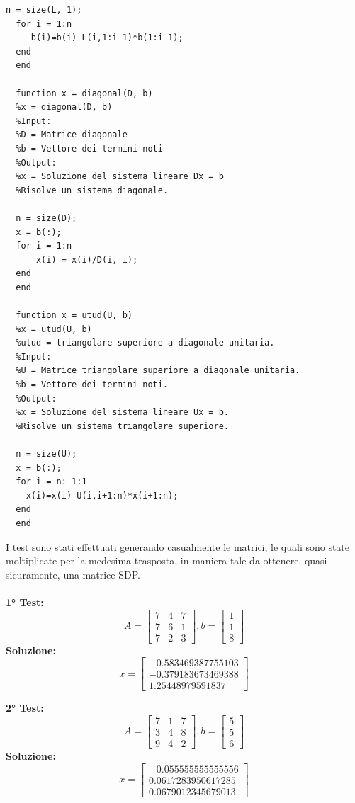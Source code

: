 \documentclass[10pt,a4paper]{article}
\begin{document}
\begin{lstlisting}[style=Matlab-editor]
  n = size(L, 1);
  for i = 1:n
     b(i)=b(i)-L(i,1:i-1)*b(1:i-1);
  end
  end
      
  function x = diagonal(D, b)
  %x = diagonal(D, b)
  %Input:
  %D = Matrice diagonale
  %b = Vettore dei termini noti
  %Output:
  %x = Soluzione del sistema lineare Dx = b
  %Risolve un sistema diagonale.
  
  n = size(D);
  x = b(:);
  for i = 1:n
      x(i) = x(i)/D(i, i);
  end
  end
      
  function x = utud(U, b)
  %x = utud(U, b)
  %utud = triangolare superiore a diagonale unitaria.
  %Input:
  %U = Matrice triangolare superiore a diagonale unitaria.
  %b = Vettore dei termini noti.
  %Output:
  %x = Soluzione del sistema lineare Ux = b.
  %Risolve un sistema triangolare superiore.
  
  n = size(U);
  x = b(:);
  for i = n:-1:1
    x(i)=x(i)-U(i,i+1:n)*x(i+1:n);
  end
  end
\end{lstlisting}

I test sono stati effettuati generando casualmente le matrici, le quali sono state moltiplicate per la medesima trasposta,
in maniera tale da ottenere, quasi sicuramente, una matrice SDP.
\\ \\
\textbf{1° Test:}
\[
  A =
  \begin{bmatrix}
    7 & 4 & 7 \\
    7 & 6 & 1 \\
    7 & 2 & 3
  \end{bmatrix},
  b =
  \begin{bmatrix}
    1 \\ 1 \\ 8
  \end{bmatrix}
\]
\textbf{Soluzione:}
\[
  x =
  \begin{bmatrix}
    -0.583469387755103 \\
    -0.379183673469388 \\
    1.25448979591837
  \end{bmatrix}
\]

\textbf{2° Test:}
\[
  A =
  \begin{bmatrix}
    7 & 1 & 7 \\
    3 & 4 & 8 \\
    9 & 4 & 2
  \end{bmatrix},
  b =
  \begin{bmatrix}
    5 \\ 5 \\ 6
  \end{bmatrix}
\]
\textbf{Soluzione:}
\[
  x =
  \begin{bmatrix}
    -0.055555555555556 \\
    0.0617283950617285 \\
    0.0679012345679013
  \end{bmatrix}
\]
\end{document}
